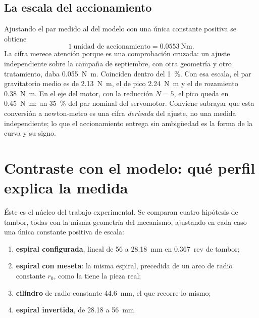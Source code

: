 \subsection{La escala del accionamiento}

Ajustando el par medido al del modelo con una única constante positiva se obtiene
\begin{equation}
  1\ \text{unidad de accionamiento} = \SI{0.0553}{\newton\metre}.
\end{equation}
La cifra merece atención porque es una comprobación cruzada: un ajuste independiente sobre la campaña
de septiembre, con otra geometría y otro tratamiento, daba \SI{0.055}{\newton\metre}. Coinciden
dentro del \SI{1}{\percent}. Con esa escala, el par gravitatorio medio es de
\SI{2.13}{\newton\metre}, el de pico \SI{2.24}{\newton\metre} y el de rozamiento
\SI{0.38}{\newton\metre}. En el eje del motor, con la reducción $N=5$, el pico queda en
\SI{0.45}{\newton\metre}: un \SI{35}{\percent} del par nominal del servomotor. Conviene subrayar que
esta conversión a newton-metro es una cifra \emph{derivada} del ajuste, no una medida independiente;
lo que el accionamiento entrega sin ambigüedad es la forma de la curva y su signo.

\section{Contraste con el modelo: qué perfil explica la medida}
\label{sec:res-contraste}

Éste es el núcleo del trabajo experimental. Se comparan cuatro hipótesis de tambor, todas con la
misma geometría del mecanismo, ajustando en cada caso una única constante positiva de escala:

\begin{enumerate}
  \item \textbf{espiral configurada}, lineal de \num{56} a \SI{28.18}{\milli\metre} en
        \SI{0.367}{rev} de tambor;
  \item \textbf{espiral con meseta}: la misma espiral, precedida de un arco de radio constante
        $r_0$, como la tiene la pieza real;
  \item \textbf{cilindro} de radio constante \SI{44.6}{\milli\metre}, el que recorre lo mismo;
  \item \textbf{espiral invertida}, de \num{28.18} a \SI{56}{\milli\metre}.
\end{enumerate}

